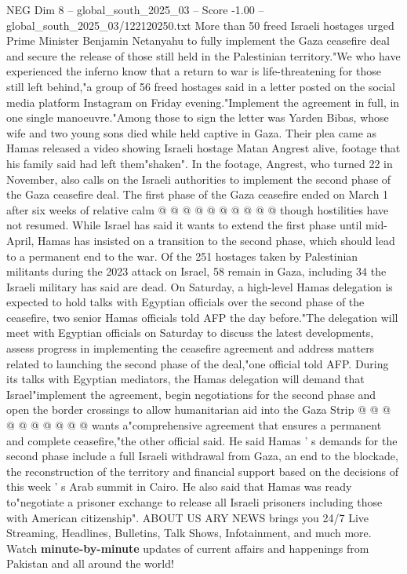 \begin{textsample}{NEG Dim 8 – global\_south\_2025\_03 – Score -1.00 – global\_south\_2025\_03/122120250.txt}  \label{ex:f8_neg_302}
More than 50 freed Israeli hostages urged Prime Minister Benjamin Netanyahu to fully implement the Gaza ceasefire deal and secure the release of those still held in the Palestinian territory."We who have experienced the inferno know that a return to war is life-threatening for those still left behind,"a group of 56 freed hostages said in a letter posted on the social media platform Instagram on Friday evening."Implement the agreement in full, in one single manoeuvre."Among those to sign the letter was Yarden Bibas, whose wife and two young sons died while held captive in Gaza.
Their plea came as Hamas released a video showing Israeli hostage Matan Angrest alive, footage that his family said had left them"shaken".
In the footage, Angrest, who turned 22 in November, also calls on the Israeli authorities to implement the second phase of the Gaza ceasefire deal.
The first phase of the Gaza ceasefire ended on March 1 after six weeks of relative calm @ @ @ @ @ @ @ @ @ @ though hostilities have not resumed.
While Israel has said it wants to extend the first phase until mid-April, Hamas has insisted on a transition to the second phase, which should lead to a permanent end to the war.
Of the 251 hostages taken by Palestinian militants during the 2023 attack on Israel, 58 remain in Gaza, including 34 the Israeli military has said are dead.
On Saturday, a high-level Hamas delegation is expected to hold talks with Egyptian officials over the second phase of the ceasefire, two senior Hamas officials told AFP the day before."The delegation will meet with Egyptian officials on Saturday to discuss the latest developments, assess progress in implementing the ceasefire agreement and address matters related to launching the second phase of the deal,"one official told AFP.
During its talks with Egyptian mediators, the Hamas delegation will demand that Israel"implement the agreement, begin negotiations for the second phase and open the border crossings to allow humanitarian aid into the Gaza Strip @ @ @ @ @ @ @ @ @ @ wants a"comprehensive agreement that ensures a permanent and complete ceasefire,"the other official said.
He said Hamas ' s demands for the second phase include a full Israeli withdrawal from Gaza, an end to the blockade, the reconstruction of the territory and financial support based on the decisions of this week ' s Arab summit in Cairo.
He also said that Hamas was ready to"negotiate a prisoner exchange to release all Israeli prisoners including those with American citizenship".
ABOUT US ARY NEWS brings you 24/7 Live Streaming, Headlines, Bulletins, Talk Shows, Infotainment, and much more.
Watch \textbf{minute-by-minute} updates of current affairs and happenings from Pakistan and all around the world!

\end{textsample}
